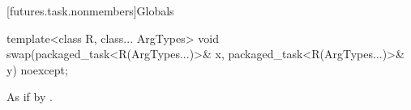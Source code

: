 [futures.task.nonmembers]{Globals}

%
\begin{itemdecl}
template<class R, class... ArgTypes>
  void swap(packaged_task<R(ArgTypes...)>& x, packaged_task<R(ArgTypes...)>& y) noexcept;
\end{itemdecl}

\begin{itemdescr}
\pnum
\effects
As if by .
\end{itemdescr}
